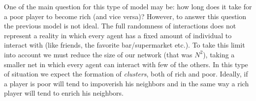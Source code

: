 One of the main question for this type of model may be: how long does it take for a poor player to become rich (and vice versa)?
However, to answer this question the previous model is not ideal.
The full randomness of interactions does not represent a reality in which every agent has a fixed amount of individual to interact with (like friends, the favorite bar/supermarket etc.).
To take this limit into account we must reduce the size of our network (that was $N^2$), taking a smaller net in which every agent can interact with few of the others.
In this type of situation we expect the formation of \emph{clusters}, both of rich and poor.
Ideally, if a player is poor will tend to impoverish his neighbors and in the same way a rich player will tend to enrich his neighbors.
